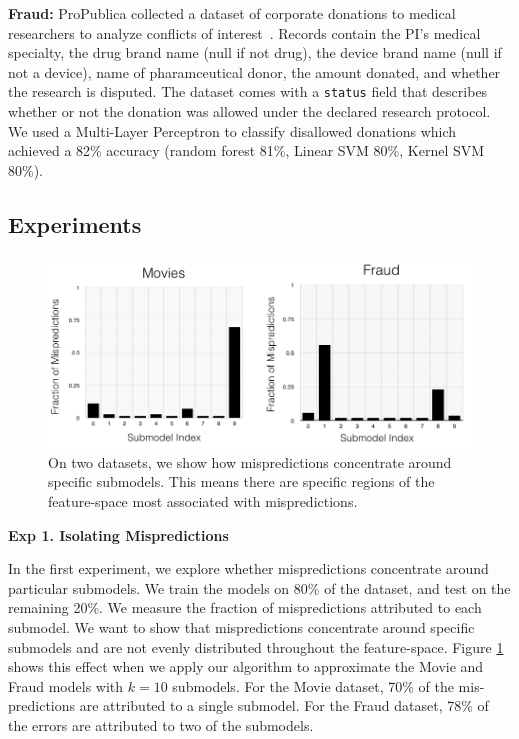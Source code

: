 \vspace{0.5em} \noindent  \textbf{Fraud: } ProPublica collected a dataset of corporate donations to medical researchers to analyze conflicts of interest~\cite{dollarsfordocs}. 
Records contain the PI's medical specialty, the drug brand name (null if not drug), the device brand name (null if not a device), name of pharamceutical donor, the amount donated, and whether the research is disputed.
The dataset comes with a \texttt{status} field that describes whether or not the donation was allowed under the declared research protocol.
We used a Multi-Layer Perceptron to classify disallowed donations which achieved a 82\% accuracy (random forest 81\%, Linear SVM 80\%, Kernel SVM 80\%).

\subsection{Experiments}

\begin{figure}[ht]
    \centering
    \includegraphics[width=\columnwidth]{figures/concentration.png}
    \caption{On two datasets, we show how mispredictions concentrate around specific submodels. This means there are specific regions of the feature-space most associated with mispredictions.}
    \label{fig:concentrate}
\end{figure}

\vspace{0.5em} \noindent \textbf{Exp 1. Isolating Mispredictions }  

In the first experiment, we explore whether mispredictions concentrate around particular submodels. We train the models on 80\% of the dataset, and test on the remaining 20\%. We measure the fraction of mispredictions attributed to each submodel. We want to show that mispredictions concentrate around specific submodels and are not evenly distributed throughout the feature-space. Figure \ref{fig:concentrate} shows this effect when we apply our algorithm to approximate the Movie and Fraud models with $k=10$ submodels. For the Movie dataset, 70\% of the mis-predictions are attributed to a single submodel.
For the Fraud dataset, 78\% of the errors are attributed to two of the submodels.

